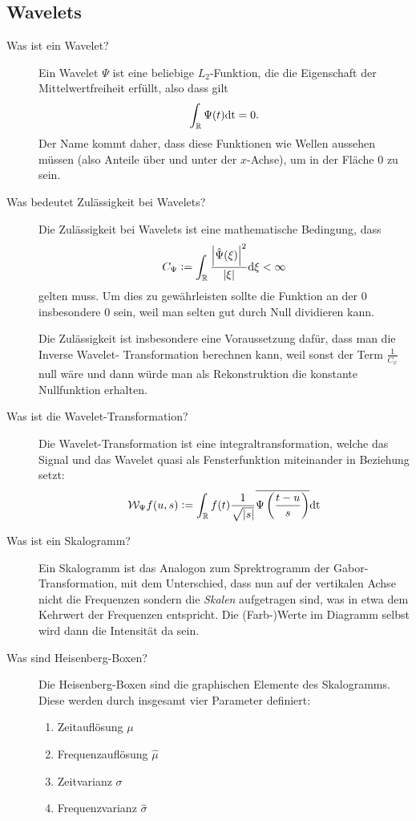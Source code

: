 \subsection{Wavelets}
\begin{description}
  \item[Was ist ein Wavelet?]
    Ein Wavelet $\Psi$ ist eine beliebige $L_2$-Funktion, die die Eigenschaft der Mittelwertfreiheit erfüllt, also dass gilt
    $$ \int_{\mathbb{R}} \Psi(t) \text{dt} = 0. $$ Der Name kommt daher, dass diese Funktionen wie Wellen aussehen müssen (also Anteile
    über und unter der $x$-Achse), um in der Fläche $0$ zu sein.
  \item[Was bedeutet Zulässigkeit bei Wavelets?]
    Die Zulässigkeit bei Wavelets ist eine mathematische Bedingung, dass 
    $$ C_\Psi := \int_{\mathbb{R}} \frac{\left|\hat \Psi(\xi)\right|^2}{|\xi|}\text{d} \xi < \infty $$
    gelten muss. Um dies zu gewährleisten sollte die Funktion an der $0$ insbesondere $0$ sein, 
    weil man selten gut durch Null dividieren kann.
    
    Die Zulässigkeit ist insbesondere eine Voraussetzung dafür, dass man die Inverse Wavelet-
    Transformation berechnen kann, weil sonst der Term $ \frac{1}{C_{\psi}} $ null wäre und dann
    würde man als Rekonstruktion die konstante Nullfunktion erhalten.
  \item[Was ist die Wavelet-Transformation?]
    Die Wavelet-Transformation ist eine integraltransformation, welche das Signal und das Wavelet quasi als Fensterfunktion
    miteinander in Beziehung setzt:
    $$ \mathcal{W}_\Psi f(u,s) := \int_{\mathbb{R}} f(t) \frac{1}{\sqrt{|s|}}\overline{\Psi\left(\frac{t-u}{s}\right)}\text{dt} $$
  \item[Was ist ein Skalogramm?]
    Ein Skalogramm ist das Analogon zum Sprektrogramm der Gabor-Transformation, mit dem Unterschied, dass nun auf der
    vertikalen Achse nicht die Frequenzen sondern die \emph{Skalen} aufgetragen sind, was in etwa dem Kehrwert der 
    Frequenzen entspricht. Die (Farb-)Werte im Diagramm selbst wird dann die Intensität da sein.
  \item[Was sind Heisenberg-Boxen?]
    Die Heisenberg-Boxen sind die graphischen Elemente des Skalogramms. Diese werden durch insgesamt vier Parameter 
    definiert:

    \begin{enumerate}
      \item Zeitauflösung $\mu$
      \item Frequenzauflösung $\hat \mu$
      \item Zeitvarianz $\sigma$
      \item Frequenzvarianz $\hat \sigma$
    \end{enumerate}


\end{description}
